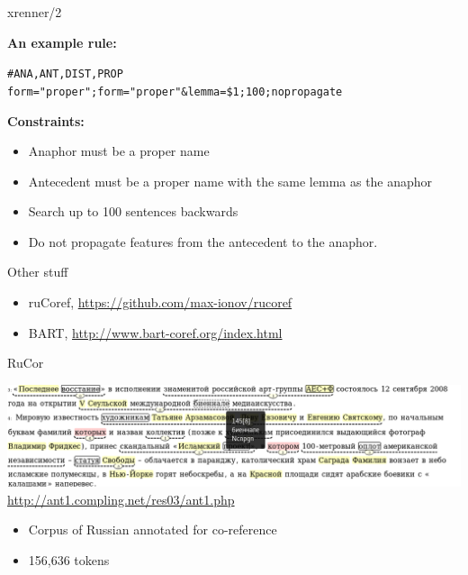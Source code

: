 \documentclass[dvipsnames, 10pt, compress]{beamer}
\begin{document}
\begin{frame}{xrenner/2}

\textbf{An example rule:} \\

\begin{alltt}
  \# ANA,        ANT,                      DIST, PROP  \\
  form="proper"; form="proper"\&lemma=\$1; 100; nopropagate
\end{alltt}

\textbf{Constraints:}
\begin{itemize}
  \item Anaphor must be a proper name
  \item Antecedent must be a proper name with the same lemma as the anaphor
  \item Search up to 100 sentences backwards
  \item Do not propagate features from the antecedent to the anaphor.
\end{itemize}


\end{frame}

\begin{frame}{Other stuff}

\begin{itemize}
   \item ruCoref, \url{https://github.com/max-ionov/rucoref}
   \item BART, \url{http://www.bart-coref.org/index.html}

\end{itemize}

\end{frame}

\begin{frame}{RuCor}

\begin{center}
\includegraphics[width=\textwidth]{graphics/rucoref-pic.png} \\
\url{http://ant1.compling.net/res03/ant1.php}
\end{center}


\begin{itemize}
  \item Corpus of Russian annotated for co-reference
  \item 156,636 tokens

\end{itemize}

\end{frame}
\end{document}
